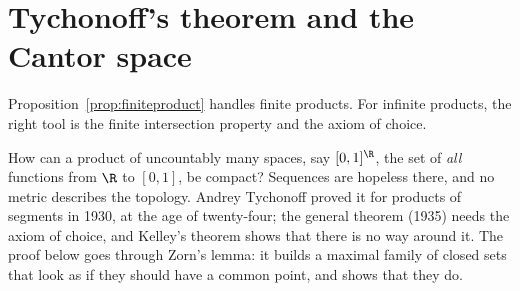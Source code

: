 \section{Tychonoff's theorem and the Cantor space}

Proposition~\ref{prop:finiteproduct} handles finite products. For infinite products, the right tool is the finite intersection property and
the axiom of choice.

How can a product of uncountably many spaces, say $[0,1]^{\R}$, the set of \emph{all} functions from $\R$ to $[0,1]$, be compact?
Sequences are hopeless there, and no metric describes the topology. Andrey Tychonoff proved it for products of segments in
1930, at the age of twenty-four; the general theorem (1935) needs the axiom of choice, and Kelley's theorem shows that there is
no way around it. The proof below goes through Zorn's lemma: it builds a maximal family of closed sets that look as if they
should have a common point, and shows that they do.

